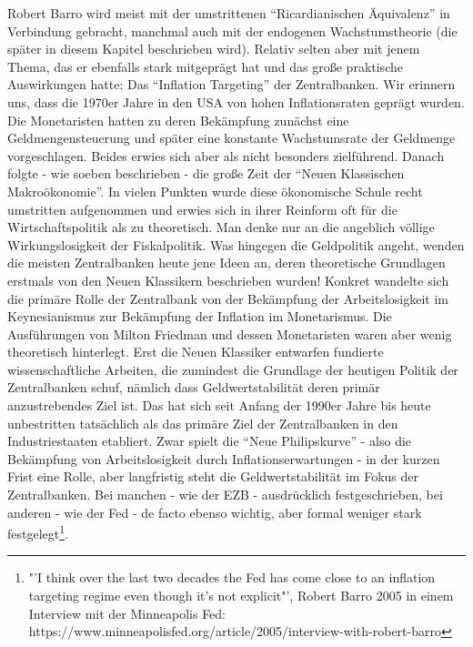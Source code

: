 Robert Barro wird meist mit der umstrittenen "`Ricardianischen Äquivalenz"' in Verbindung gebracht, manchmal auch mit der endogenen Wachstumstheorie (die später in diesem Kapitel beschrieben wird). Relativ selten aber mit jenem Thema, das er ebenfalls stark mitgeprägt hat und das große praktische Auswirkungen hatte: Das "`Inflation Targeting"' der Zentralbanken. Wir erinnern uns, dass die 1970er Jahre in den USA von hohen Inflationsraten geprägt wurden. Die Monetaristen hatten zu deren Bekämpfung zunächst eine Geldmengensteuerung und später eine konstante Wachstumsrate der Geldmenge vorgeschlagen. Beides erwies sich aber als nicht besonders zielführend. Danach folgte - wie soeben beschrieben - die große Zeit der "`Neuen Klassischen Makroökonomie"'. In vielen Punkten wurde diese ökonomische Schule recht umstritten aufgenommen und erwies sich in ihrer Reinform oft für die Wirtschaftspolitik als zu theoretisch. Man denke nur an die angeblich völlige Wirkungslosigkeit der Fiskalpolitik. Was hingegen die Geldpolitik angeht, wenden die meisten Zentralbanken heute jene Ideen an, deren theoretische Grundlagen erstmals von den Neuen Klassikern beschrieben wurden! 
Konkret wandelte sich die primäre Rolle der Zentralbank von der Bekämpfung der Arbeitslosigkeit im Keynesianismus zur Bekämpfung der Inflation im Monetarismus. Die Ausführungen von Milton Friedman und dessen Monetaristen waren aber wenig theoretisch hinterlegt. Erst die Neuen Klassiker entwarfen fundierte wissenschaftliche Arbeiten, die zumindest die Grundlage der heutigen Politik der Zentralbanken schuf, nämlich dass Geldwertstabilität deren primär anzustrebendes Ziel ist. Das hat sich seit Anfang der 1990er Jahre bis heute unbestritten tatsächlich als das primäre Ziel der Zentralbanken in den Industriestaaten etabliert. Zwar spielt die "`Neue Philipskurve"' - also die Bekämpfung von Arbeitslosigkeit durch Inflationserwartungen -  in der kurzen Frist eine Rolle, aber langfristig steht die Geldwertstabilität im Fokus der Zentralbanken. Bei manchen - wie der EZB - ausdrücklich festgeschrieben, bei anderen - wie der Fed - de facto ebenso wichtig, aber formal weniger stark festgelegt\footnote{"'I think over the last two decades the Fed has come close to an inflation targeting regime even though it's not explicit"', Robert Barro 2005 in einem Interview mit der Minneapolis Fed: https://www.minneapolisfed.org/article/2005/interview-with-robert-barro}.

